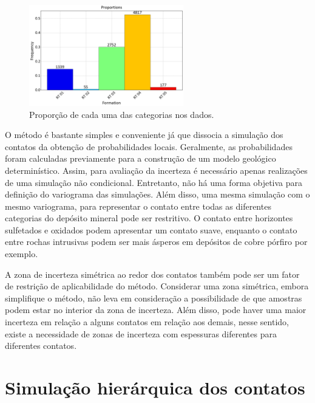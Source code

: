 \begin{figure}[H]
	\caption{\label{proportions} Proporção de cada uma das categorias nos dados.}
	\centering
		\includegraphics[width=0.6\textwidth]{capitulo_3/imagens/proportions.png}
\end{figure}

O método é bastante simples e conveniente já que dissocia a simulação dos contatos da obtenção de probabilidades locais. Geralmente, as probabilidades foram calculadas previamente para a construção de um modelo geológico determinístico. Assim, para avaliação da incerteza é necessário apenas realizações de uma simulação não condicional. Entretanto, não há uma forma objetiva para definição do variograma das simulações. Além disso, uma mesma simulação com o mesmo variograma, para representar o contato entre todas as diferentes categorias do depósito mineral pode ser restritivo. O contato entre horizontes sulfetados e oxidados podem apresentar um contato suave, enquanto o contato entre rochas intrusivas podem ser mais ásperos em depósitos de cobre pórfiro por exemplo.

A zona de incerteza simétrica ao redor dos contatos também pode ser um fator de restrição de aplicabilidade do método. Considerar uma zona simétrica, embora simplifique o método, não leva em consideração a possibilidade de que amostras podem estar no interior da zona de incerteza. Além disso, pode haver uma maior incerteza em relação a alguns contatos em relação aos demais, nesse sentido, existe a necessidade de zonas de incerteza com espessuras diferentes para diferentes contatos.

\section{Simulação hierárquica dos contatos}\label{hier_bound_sim}

